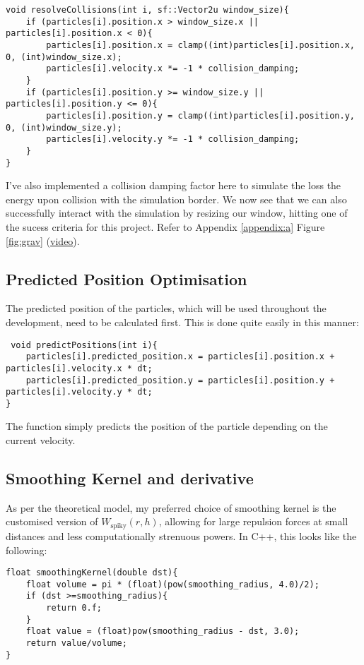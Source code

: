 \documentclass[write-up.tex]{subfiles}
\begin{document}
\begin{lstlisting}
void resolveCollisions(int i, sf::Vector2u window_size){
    if (particles[i].position.x > window_size.x || particles[i].position.x < 0){
        particles[i].position.x = clamp((int)particles[i].position.x, 0, (int)window_size.x);
        particles[i].velocity.x *= -1 * collision_damping;
    }
    if (particles[i].position.y >= window_size.y || particles[i].position.y <= 0){
        particles[i].position.y = clamp((int)particles[i].position.y, 0, (int)window_size.y);
        particles[i].velocity.y *= -1 * collision_damping;
    }
}
\end{lstlisting}

I've also implemented a collision damping factor here to simulate the loss the energy upon collision with the simulation border. We now see that we can also successfully interact with the simulation by resizing our window, hitting one of the sucess criteria for this project. Refer to Appendix \ref{appendix:a} Figure \ref{fig:grav} (\href{https://youtube.com/shorts/wO0xUBSKVck?feature=share}{video}).
\subsection{Predicted Position Optimisation}

The predicted position of the particles, which will be used throughout the development, need to be calculated first. This is done quite easily in this manner:

\begin{lstlisting}
 void predictPositions(int i){
    particles[i].predicted_position.x = particles[i].position.x + particles[i].velocity.x * dt;
    particles[i].predicted_position.y = particles[i].position.y + particles[i].velocity.y * dt;
}
\end{lstlisting}
The function simply predicts the position of the particle depending on the current velocity.


\subsection{Smoothing Kernel and derivative}

As per the theoretical model, my preferred choice of smoothing kernel is the customised version of $W_{\text{spiky}}(r, h)$, allowing for large repulsion forces at small distances and less computationally strenuous powers. In C++, this looks like the following:

\begin{lstlisting}
float smoothingKernel(double dst){
    float volume = pi * (float)(pow(smoothing_radius, 4.0)/2);
    if (dst >=smoothing_radius){
        return 0.f;
    }
    float value = (float)pow(smoothing_radius - dst, 3.0);
    return value/volume;
}
\end{lstlisting}
\end{document}
